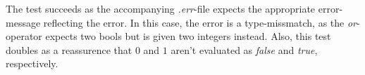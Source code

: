 The test succeeds as the accompanying \textit{.err}-file expects the appropriate error-message reflecting the error. In this case, the error is a type-missmatch, as the \textit{or}-operator expects two bools but is given two integers instead. Also, this test doubles as a reassurence that $0$ and $1$ aren't evaluated as \textit{false} and \textit{true}, respectively. 
